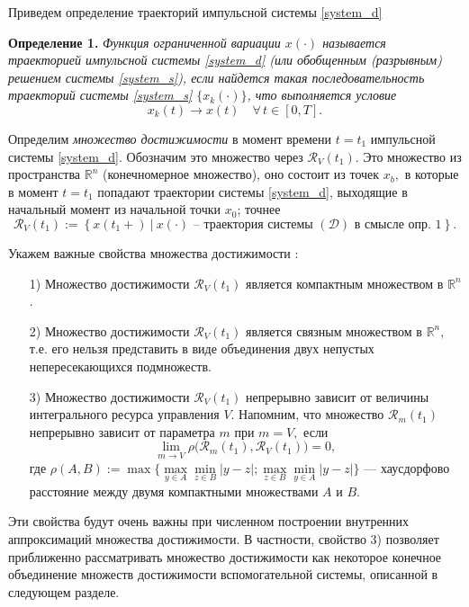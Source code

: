 Приведем определение траекторий импульсной системы \eqref{system_d}

{\bf Определение 1.}
  {\it Функция ограниченной вариации $x(\cdot)$ называется траекторией
  импульсной системы \eqref{system_d} (или обобщенным (разрывным)
  решением системы \eqref{system_s}), если найдется такая последовательность
  траекторий системы \eqref{system_s} $\bigl\{x_k(\cdot)\bigr\}$, что выполняется
  условие 
\begin{equation*}
  x_k(t)\to x(t) \quad  \forall \, t\in [0,T].
\end{equation*}}


Определим \emph{множество достижимости} в момент  времени $t=t_1$
импульсной системы \eqref{system_d}. Обозначим это множество через 
$ {\mathcal R}_V(t_1)$. Это множество из  пространства ${\mathbb R}^n$
(конечномерное  множество), оно состоит из точек $x_b,$ в  которые в
момент $t=t_1$ попадают траектории  системы \eqref{system_d}, выходящие
в начальный  момент из начальной точки $x_0$; точнее
\begin{equation*} 
  {\mathcal R}_V(t_1):=\left\{ x(t_1+) \ \big| \
    x(\cdot) \mbox{ -- траектория системы } ({\mathcal D}) \mbox{ в
      смысле опр. 1} \right\}.
\end{equation*}

Укажем важные свойства множества достижимости \cite{ZS1991, SS2010}:

\begin{itemize}
\item[ 1)] Множество достижимости ${\mathcal R}_V(t_1)$ является
компактным множеством в ${\mathbb R}^n$.
\item[ 2)] Множество достижимости ${\mathcal R}_V(t_1)$ является связным
множеством в ${\mathbb R}^n,$ т.е. его нельзя представить в виде
объединения двух непустых непересекающихся подмножеств.
\item[ 3)] Множество достижимости ${\mathcal R}_V(t_1)$ непрерывно
зависит от величины интегрального ресурса управления $V$. Напомним,
что множество ${\mathcal R}_m(t_1)$ непрерывно зависит от параметра $m$
при $m=V,$ если
\begin{equation*} 
  \lim_{m\to V} \rho\Big( {\mathcal R}_m(t_1) , {\mathcal
    R}_V(t_1) \Big) =0 ,
\end{equation*} где $\rho(A,B):=\max\bigl\{ \max\limits_{y\in
A}\min\limits_{z\in B} |y-z| ; \max\limits_{z\in B}\min\limits_{y\in
A} |y-z| \bigr\}$ --- хаусдорфово расстояние между двумя компактными
множествами $A$ и $B$. 
\end{itemize}

Эти свойства будут очень важны при численном построении внутренних
аппроксимаций множества достижимости.  В частности, свойство 3)
позволяет приближенно рассматривать множество достижимости как
некоторое конечное объединение множеств достижимости вспомогательной
системы, описанной в следующем разделе.


